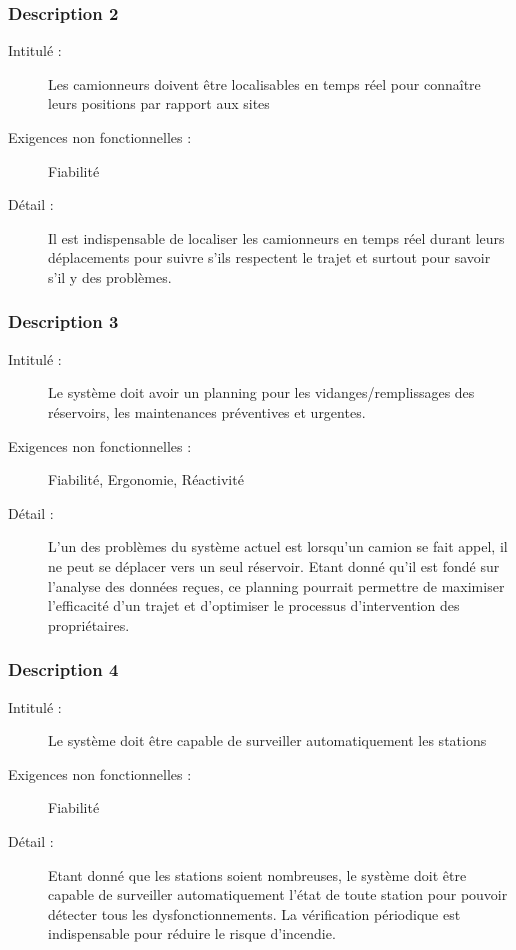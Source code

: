 \documentclass[11pt]{article}
\begin{document}
\subsubsection {Description 2}
\begin{description}
           \item[Intitulé :] Les camionneurs doivent être localisables en temps réel pour connaître leurs positions par rapport aux sites 
           \item[Exigences non fonctionnelles :] Fiabilité
           \item[Détail :] Il est indispensable de localiser les camionneurs en temps réel durant leurs déplacements pour suivre s’ils respectent le trajet et surtout pour savoir s’il y des problèmes.
\end{description}

\subsubsection {Description 3}
\begin{description}
           \item[Intitulé :] Le système doit avoir un planning pour les vidanges/remplissages des réservoirs, les maintenances préventives et urgentes. 
           \item[Exigences non fonctionnelles :] Fiabilité, Ergonomie, Réactivité
           \item[Détail :] L’un des problèmes du système actuel est lorsqu’un camion se fait appel, il ne peut se déplacer vers un seul réservoir. Etant  donné qu’il est fondé sur l’analyse des données reçues, ce planning pourrait permettre de maximiser l’efficacité d’un trajet et d’optimiser le processus d’intervention des propriétaires. 
\end{description}

\subsubsection {Description 4}
\begin{description}
           \item[Intitulé :] Le système doit être capable de surveiller automatiquement les stations 
           \item[Exigences non fonctionnelles :] Fiabilité
           \item[Détail :] Etant donné que les stations soient nombreuses, le système doit être capable de surveiller automatiquement  l’état de toute station pour pouvoir détecter tous les dysfonctionnements.  La vérification périodique est indispensable pour réduire le risque d’incendie.  
\end{description}
\end{document}
